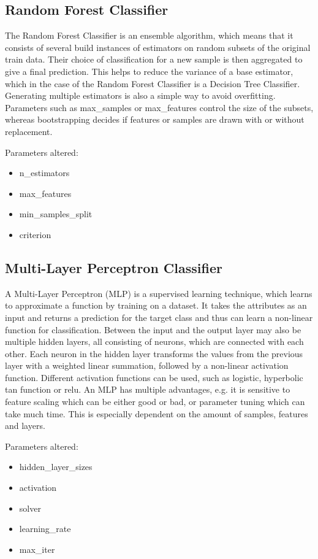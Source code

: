 \documentclass{article}
\begin{document}
\subsection{Random Forest Classifier}
The Random Forest Classifier is an ensemble algorithm, which means that it consists of several build instances of estimators on random subsets of the original train data. Their choice of classification for a new sample is then aggregated to give a final prediction. This helps to reduce the variance of a base estimator, which in the case of the Random Forest Classifier is a Decision Tree Classifier. Generating multiple estimators is also a simple way to avoid overfitting. Parameters such as max\_samples or max\_features control the size of the subsets, whereas bootstrapping decides if features or samples are drawn with or without replacement.

Parameters altered:
\begin{itemize}
\item n\_estimators
\item max\_features
\item min\_samples\_split
\item criterion
\end{itemize}

\subsection{Multi-Layer Perceptron Classifier}
A Multi-Layer Perceptron (MLP) is a supervised learning technique, which learns to approximate a function
by training on a dataset. It takes the attributes as an input and returns a prediction for the target class and thus can learn a non-linear function for classification. Between the input and the output layer may also be multiple hidden layers, all consisting of neurons, which are connected with each other. Each neuron in the hidden layer transforms the values from the previous layer with a weighted linear summation, followed by a non-linear activation function. Different activation functions can be used, such as logistic, hyperbolic tan function or relu. An MLP has multiple advantages, e.g. it is sensitive to feature scaling which can be either good or bad, or parameter tuning which can take much time. This is especially dependent on the amount of samples, features and layers.

Parameters altered:
\begin{itemize}
\item hidden\_layer\_sizes
\item activation
\item solver
\item learning\_rate
\item max\_iter
\end{itemize}
\end{document}
